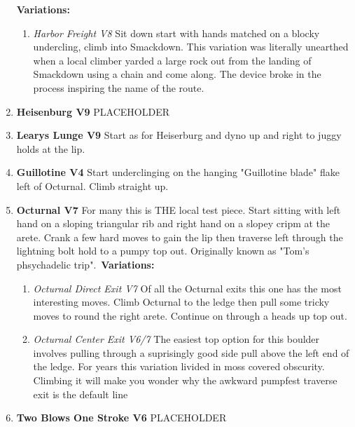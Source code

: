 \begin{enumerate}[]
	\newline \textbf{Variations:}
	\begin{enumerate}
		\item\label{vr:Harbor Freight} \colorbox{Goldenrod!50}{\emph{Harbor Freight V8 \ding{72}    }  }
		\newline Sit down start with hands matched on a blocky undercling, climb into Smackdown. This variation was literally unearthed when a local climber yarded a large rock out from the landing of Smackdown using a chain and come along. The device broke in the process inspiring the name of the route.\
	\end{enumerate}
	\setcounter{enumi}{5}
	\item\label{rt:Heisenburg} \colorbox{Goldenrod!50}{\textbf{Heisenburg V9  } }
	\newline PLACEHOLDER\
	\setcounter{enumi}{6}
	\item\label{rt:Learys Lunge} \colorbox{Goldenrod!50}{\textbf{Learys Lunge V9  } }
	\newline Start as for Heiserburg and dyno up and right to juggy holds at the lip.\
	\setcounter{enumi}{7}
	\item\label{rt:Guillotine} \colorbox{RoyalBlue!20}{\textbf{Guillotine V4    } }
	\newline Start underclinging on the hanging "Guillotine blade" flake left of Octurnal. Climb straight up.\
	\setcounter{enumi}{8}
	\item\label{rt:Octurnal} \colorbox{Goldenrod!50}{\textbf{Octurnal V7     } }
	\newline For many this is THE local test piece. Start sitting with left hand on a sloping triangular rib and right hand on a slopey cripm at the arete. Crank a few hard moves to gain the lip then traverse left through the lightning bolt hold to a pumpy top out. Originally known as "Tom's phsychadelic trip".\
	\newline \textbf{Variations:}
	\begin{enumerate}
		\item\label{vr:Octurnal Direct Exit} \colorbox{Goldenrod!50}{\emph{Octurnal Direct Exit V7     }  }
		\newline Of all the Octurnal exits this one has the most interesting moves. Climb Octurnal to the ledge then pull some tricky moves to round the right arete. Continue on through a heads up top out.\
		\item\label{vr:Octurnal Center Exit} \colorbox{Goldenrod!50}{\emph{Octurnal Center Exit V6/7    }  }
		\newline The easiest top option for this boulder involves pulling through a suprisingly good side pull above the left end of the ledge. For years this variation livided in moss covered obscurity. Climbing it will make you wonder why the awkward pumpfest traverse exit is the default line\
	\end{enumerate}
	\setcounter{enumi}{9}
	\item\label{rt:Two Blows One Stroke} \colorbox{RoyalBlue!20}{\textbf{Two Blows One Stroke V6  } }
	\newline PLACEHOLDER\
\end{enumerate}
